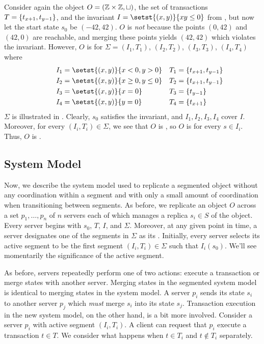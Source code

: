 \begin{example}
  Consider again the object $O = (\mathbb{Z} \times \mathbb{Z}, \sqcup)$, the set of
  transactions $T = \{t_{x+1}, t_{y-1}\}$, and the invariant $I = \setst{(x,
  y)}{xy \leq 0}$ from , but now let the start state $s_0$ be
  $(-42, 42)$. $O$ is \emph{not} \sTIconfluent{} because the points $(0, 42)$
  and $(42, 0)$ are reachable, and merging these points yields $(42, 42)$ which
  violates the invariant. However, $O$ is \sTISconfluent{} for $\Sigma = (I_1,
  T_1)$, $(I_2, T_2)$, $(I_3, T_3)$, $(I_4, T_4)$ where
  \begin{align*}
    \qquad I_1 &= \setst{(x, y)}{x < 0, y > 0}       &T_1 &= \set{t_{x+1}, t_{y-1}} \\
    \qquad I_2 &= \setst{(x, y)}{x \geq 0, y \leq 0} &T_2 &= \set{t_{x+1}, t_{y-1}} \\
    \qquad I_3 &= \setst{(x, y)}{x = 0}              &T_3 &= \set{t_{y-1}} \\
    \qquad I_4 &= \setst{(x, y)}{y = 0}              &T_4 &= \set{t_{x+1}}
  \end{align*}
  $\Sigma$ is illustrated in . Clearly, $s_0$ satisfies the
  invariant, and $I_1, I_2, I_3, I_4$ cover $I$. Moreover, for every $(I_i,
  T_i) \in \Sigma$, we see that $O$ is , so $O$ is
   for every $s \in I_i$. Thus, $O$ is
  \sTISconfluent{}.
\end{example}

{}

\subsection{System Model}
Now, we describe the system model used to replicate a segmented
\invariantconfluent{} object without any coordination within a segment and with
only a small amount of coordination when transitioning between segments. As
before, we replicate an object $O$ across a set $p_1, \ldots, p_n$ of $n$
servers each of which manages a replica $s_i \in S$ of the object. Every server
begins with $s_0$, $T$, $I$, and $\Sigma$. Moreover, at any given point in
time, a server designates one of the segments in $\Sigma$ as its
.  Initially, every server selects its active segment
to be the first segment $(I_i, T_i) \in \Sigma$ such that $I_i(s_0)$. We'll see
momentarily the significance of the active segment.

As before, servers repeatedly perform one of two actions: execute a transaction
or merge states with another server. Merging states in the segmented
\invariantconfluence{} system model is identical to merging states in the
\invariantconfluence{} system model. A server $p_i$ sends its state $s_i$ to
another server $p_j$ which \emph{must} merge $s_i$ into its state $s_j$.
%
Transaction execution in the new system model, on the other hand, is a bit more
involved. Consider a server $p_i$ with active segment $(I_i, T_i)$. A client
can request that $p_i$ execute a transaction $t \in T$. We consider what
happens when $t \in T_i$ and $t \notin T_i$ separately.

